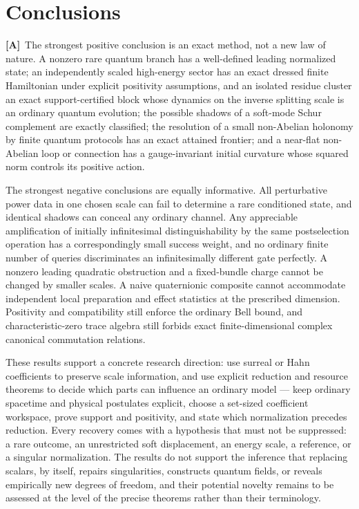 \documentclass[11pt,oneside]{article}
\numberwithin{equation}{section}
\theoremstyle{plain}
\theoremstyle{definition}
\theoremstyle{remark}
\newcommand{\TA}{\textcolor{TierA}{\textsf{\bfseries[A]}}}
\begin{document}
\section{Conclusions}\label{qgs:sec:conclusion}
\TA\ The strongest positive conclusion is an exact method, not a new law of nature. A nonzero rare quantum branch has a well-defined leading normalized state; an independently scaled high-energy sector has an exact dressed finite Hamiltonian under explicit positivity assumptions, and an isolated residue cluster an exact support-certified block whose dynamics on the inverse splitting scale is an ordinary quantum evolution; the possible shadows of a soft-mode Schur complement are exactly classified; the resolution of a small non-Abelian holonomy by finite quantum protocols has an exact attained frontier; and a near-flat non-Abelian loop or connection has a gauge-invariant initial curvature whose squared norm controls its positive action.

The strongest negative conclusions are equally informative. All perturbative power data in one chosen scale can fail to determine a rare conditioned state, and identical shadows can conceal any ordinary channel. Any appreciable amplification of initially infinitesimal distinguishability by the same postselection operation has a correspondingly small success weight, and no ordinary finite number of queries discriminates an infinitesimally different gate perfectly. A nonzero leading quadratic obstruction and a fixed-bundle charge cannot be changed by smaller scales. A naive quaternionic composite cannot accommodate independent local preparation and effect statistics at the prescribed dimension. Positivity and compatibility still enforce the ordinary Bell bound, and characteristic-zero trace algebra still forbids exact finite-dimensional complex canonical commutation relations.

These results support a concrete research direction: use surreal or Hahn coefficients to preserve scale information, and use explicit reduction and resource theorems to decide which parts can influence an ordinary model --- keep ordinary spacetime and physical postulates explicit, choose a set-sized coefficient workspace, prove support and positivity, and state which normalization precedes reduction. Every recovery comes with a hypothesis that must not be suppressed: a rare outcome, an unrestricted soft displacement, an energy scale, a reference, or a singular normalization. The results do not support the inference that replacing scalars, by itself, repairs singularities, constructs quantum fields, or reveals empirically new degrees of freedom, and their potential novelty remains to be assessed at the level of the precise theorems rather than their terminology.
\end{document}
